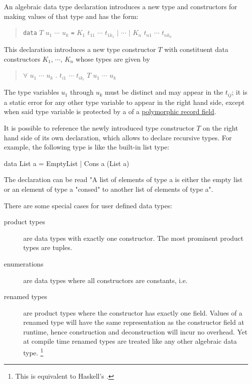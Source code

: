 An algebraic data type declaration introduces a new type and constructors for making values of that type and has the form:
\begin{quote}
\texttt{data} $T$ $u_1$ $\cdots$ $u_k$ \texttt{=} $K_1$ $t_{11}$ $\cdots$ $t_{1k_1}$ $|$ $\cdots$ $|$ $K_n$ $t_{n1}$ $\cdots$ $t_{nk_n}$
\end{quote}

This declaration introduces a new type constructor $T$ with constituent data constructors $K_1$, $\cdots$, $K_n$ whose types are given by
\begin{quote}
$\forall$ $u_1$ $\cdots$ $u_k$ . $t_{i1}$ \arrow{} $\cdots$ \arrow{} $t_{ik_i}$ \arrow{} $T$ $u_1$ $\cdots$ $u_k$
\end{quote}

The type variables $u_1$ through $u_k$ must be distinct and may appear in the $t_{ij}$; it is a static error for any other type variable to appear in the right hand side, except when said type variable is protected by a  of a \hyperref[polyrf]{polymorphic record field}.

It is possible to reference the newly introduced type constructor $T$ on the right hand side of its own declaration, which allows to declare recursive types. For example, the following type is like the built-in list type:

\begin{code}
data List a = EmptyList | Cons a (List a)
\end{code}

The declaration can be read "A list of elements of type a is either the empty list or an element of type a "consed" to another list of elements of type a".

There are some special cases for user defined data types:
\begin{description}
\item [product types] are data types with exactly one constructor. The most prominent product types are tuples.
\item [enumerations] are data types where all constructors are constants, i.e. 
\item [renamed types] are product types where the constructor has exactly one field. Values of a renamed type will have the same representation as the constructor field at runtime, hence construction and deconstruction will incur no overhead. Yet at compile time renamed types are treated like any other algebraic data type.
\footnote{This is equivalent to Haskell's .}
\end{description}

